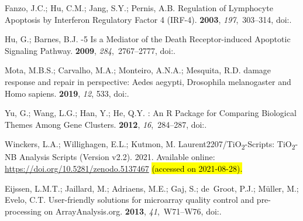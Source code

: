 \documentclass[ijms,article,accept,moreauthors,pdftex]{Definitions/mdpi}
\begin{document}
\begin{thebibliography}{999}
Fanzo, J.C.; Hu, C.M.; Jang, S.Y.; Pernis, A.B.
\newblock Regulation of Lymphocyte Apoptosis by Interferon Regulatory Factor 4
  ({IRF}-4).
 {\bf 2003}, {\em
  197},~303--314,
\newblock
  doi:{\href{https://doi.org/10.1084/jem.20020717}{}}.

Hu, G.; Barnes, B.J.
-5 Is a Mediator of the Death Receptor-induced Apoptotic
  Signaling Pathway.
 {\bf 2009}, {\em
  284},~2767--2777,
\newblock
  doi:{\href{https://doi.org/10.1074/jbc.m804744200}{}}.

Mota, M.B.S.; Carvalho, M.A.; Monteiro, A.N.A.; Mesquita, R.D.
 damage response and repair in perspective: Aedes aegypti,
  Drosophila melanogaster and Homo sapiens.
 {\bf 2019}, {\em 12}, 533,
\newblock
  doi:{\href{https://doi.org/10.1186/s13071-019-3792-1}{}}.

Yu, G.; Wang, L.G.; Han, Y.; He, Q.Y.
: An R Package for Comparing Biological Themes Among
  Gene Clusters.
 {\bf 2012}, {\em
  16},~284--287,
\newblock
  doi:{\href{https://doi.org/10.1089/omi.2011.0118}{}}.

Winckers, L.A.; Willighagen, E.L.; Kutmon, M.
\newblock Laurent2207/TiO\textsubscript{2}-Scripts: TiO\textsubscript{2}-NB Analysis Scripts (Version v2.2). 2021.
\newblock Available online:  \url{https://doi.org/10.5281/zenodo.5137467} \hl{(accessed on 2021-08-28). } %

Eijssen, L.M.T.; Jaillard, M.; Adriaens, M.E.; Gaj, S.; de~Groot, P.J.;
  M\"{u}ller, M.; Evelo, C.T.
\newblock User-friendly solutions for microarray quality control and
  pre-processing on {ArrayAnalysis}.org.
 {\bf 2013}, {\em 41},~W71--W76,
\newblock
  doi:{\href{https://doi.org/10.1093/nar/gkt293}{}}.


\end{thebibliography}
\end{document}
